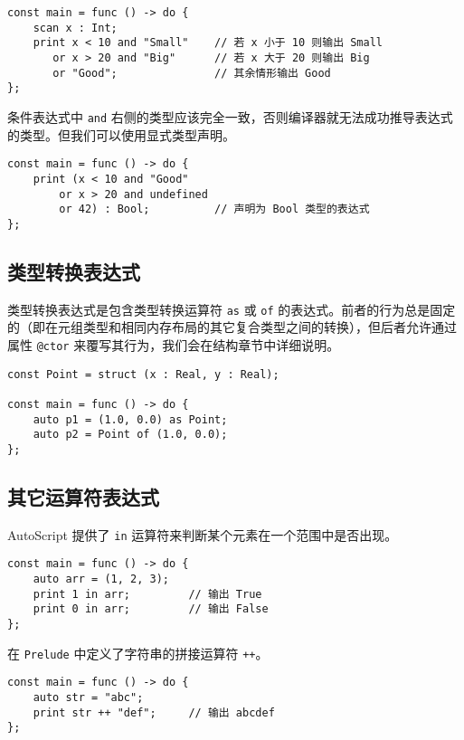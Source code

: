 \begin{lstlisting}
const main = func () -> do {
    scan x : Int;
    print x < 10 and "Small"    // 若 x 小于 10 则输出 Small
       or x > 20 and "Big"      // 若 x 大于 20 则输出 Big
       or "Good";               // 其余情形输出 Good
};
\end{lstlisting}

条件表达式中 \lstinline!and! 右侧的类型应该完全一致，否则编译器就无法成功推导表达式的类型。但我们可以使用显式类型声明。

\begin{lstlisting}
const main = func () -> do {
	print (x < 10 and "Good"
		or x > 20 and undefined
		or 42) : Bool;			// 声明为 Bool 类型的表达式
};
\end{lstlisting}

\subsection{类型转换表达式}

类型转换表达式是包含类型转换运算符 \lstinline!as! 或 \lstinline!of! 的表达式。前者的行为总是固定的（即在元组类型和相同内存布局的其它复合类型之间的转换），但后者允许通过属性 \lstinline!@ctor! 来覆写其行为，我们会在结构章节中详细说明。

\begin{lstlisting}
const Point = struct (x : Real, y : Real);

const main = func () -> do {
    auto p1 = (1.0, 0.0) as Point;
    auto p2 = Point of (1.0, 0.0);
};
\end{lstlisting}


\subsection{其它运算符表达式}

AutoScript 提供了 \lstinline!in! 运算符来判断某个元素在一个范围中是否出现。

\begin{lstlisting}
const main = func () -> do {
    auto arr = (1, 2, 3);
    print 1 in arr;         // 输出 True
    print 0 in arr;         // 输出 False
};
\end{lstlisting}

在 \lstinline!Prelude! 中定义了字符串的拼接运算符 \lstinline!++!。

\begin{lstlisting}
const main = func () -> do {
    auto str = "abc";
    print str ++ "def";     // 输出 abcdef
};
\end{lstlisting}

